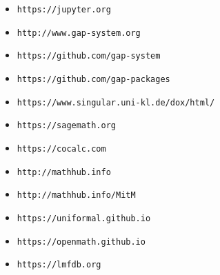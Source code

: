 \documentclass[14pt, a1paper, portrait, margin=0mm, innermargin=5mm, blockverticalspace=7mm, colspace=5mm, subcolspace=8mm]{tikzposter}
\begin{document}
{\begin{center}
    \begin{multicols*}{4}
      \begin{itemize}
      \setlength\itemsep{0.01em}
      \item[] \texttt{https://jupyter.org}
      \item[] \texttt{http://www.gap-system.org}
      \item[] \texttt{https://github.com/gap-system}
      \item[] \texttt{https://github.com/gap-packages}
      \item[] \texttt{https://www.singular.uni-kl.de/dox/html/}
      \item[] \texttt{https://sagemath.org}
      \item[] \texttt{https://cocalc.com}
      \item[] \texttt{http://mathhub.info}
      \item[] \texttt{http://mathhub.info/MitM}
      \item[] \texttt{https://uniformal.github.io}
      \item[] \texttt{https://openmath.github.io}
      \item[] \texttt{https://lmfdb.org}
      \end{itemize}
    \end{multicols*}
  \end{center}
}

\end{document}

